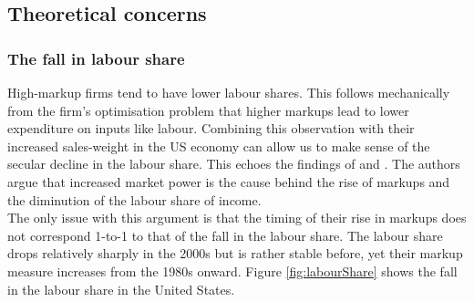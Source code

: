\documentclass{amsart}
\theoremstyle{definition}
\theoremstyle{remark}
\numberwithin{equation}{section}
\begin{document}



\subsection*{Theoretical concerns}

\subsubsection*{The fall in labour share} High-markup firms tend to have lower labour shares. This follows mechanically from the firm's optimisation problem that higher markups lead to lower expenditure on inputs like labour. Combining this observation with their increased sales-weight in the US economy can allow us to make sense of the secular decline in the labour share. This echoes the findings of \cite{autor2019fall} and \cite{kehrig2017growing}. The authors argue that increased market power is the cause behind the rise of markups and the diminution of the labour share of income.\\

The only issue with this argument is that the timing of their rise in markups does not correspond 1-to-1 to that of the fall in the labour share. The labour share drops relatively sharply in the 2000s but is rather stable before, yet their markup measure increases from the 1980s onward. Figure \ref{fig:labourShare} shows the fall in the labour share in the United States.
\end{document}
